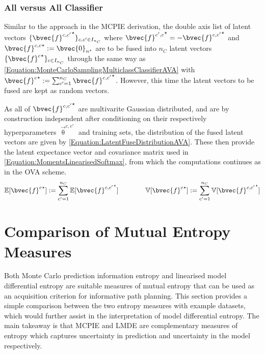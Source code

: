 			\subsubsection{All versus All Classifier}
			\label{InformativeSeafloorExploration:LMDE:Multiclass:AVA}
					
				Similar to the approach in the MCPIE derivation, the double axis list of latent vectors $\{ {\bvec{f}^{c, c'}}^{\star} \}_{c, c' \in I_{n_{C}}}$ where ${\bvec{f}^{c', c}}^{\star} = - {\bvec{f}^{c, c'}}^{\star}$ and ${\bvec{f}^{c, c}}^{\star} := \bvec{0}_{n^{\star}}$  are to be fused into $n_{C}$ latent vectors $\{ {\bvec{f}^{c}}^{\star} \}_{c \in I_{n_{C}}}$ through the same way as \eqref{Equation:MonteCarloSamplingMulticlassClassifierAVA} with ${\bvec{f}^{c}}^{\star} := \sum_{c' = 1}^{n_{C}} {\bvec{f}^{c, c'}}^{\star}$. However, this time the latent vectors to be fused are kept as random vectors. 
			
				As all of ${\bvec{f}^{c, c'}}^{\star}$ are multivarite Gaussian distributed, and are by construction independent after conditioning on their respectively hyperparameters $\vec{\uptheta}^{c, c'}$ and training sets, the distribution of the fused latent vectors are given by \eqref{Equation:LatentFuseDistributionAVA}. These then provide the latent expectance vector and covariance matrix used in \eqref{Equation:MomentsLinearisedSoftmax}, from which the computations continues as in the OVA scheme. \begin{equation}
					\begin{aligned}
						\mathbb{E}[{\bvec{f}^{c}}^{\star}] := \sum_{c' = 1}^{n_{C}} \mathbb{E}[{\bvec{f}^{c, c'}}^{\star}] \qquad \qquad \mathbb{V}[{\bvec{f}^{c}}^{\star}] := \sum_{c' = 1}^{n_{C}} \mathbb{V}[{\bvec{f}^{c, c'}}^{\star}]
					\end{aligned}
				\label{Equation:LatentFuseDistributionAVA}
				\end{equation}

	\section{Comparison of Mutual Entropy Measures}
	\label{InformativeSeafloorExploration:ComparisonMutualEntropyMeasures}
	
		Both Monte Carlo prediction information entropy and linearised model differential entropy are suitable measures of mutual entropy that can be used as an acquisition criterion for informative path planning. This section provides a simple comparison between the two entropy measures with example datasets, which would further assist in the interpretation of model differential entropy. The main takeaway is that MCPIE and LMDE are complementary measures of entropy which captures uncertainty in prediction and uncertainty in the model respectively.
	
